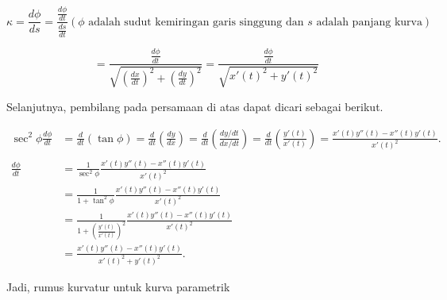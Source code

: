 \documentclass[12pt,Times new roman,letterpaper]{book}
\begin{document}
\begin{eulernootebook}
\begin{eulercomment}
\begin{eulercomment}
\begin{eulernootebook}
\begin{eulercomment}
\begin{eulercomment}
\begin{eulercomment}
\begin{eulercomment}
\begin{eulercomment}
\begin{eulercomment}
\begin{eulernotebook}
\begin{eulercomment}
\begin{eulercomment}
\begin{eulercomment}
\begin{eulercomment}
\begin{eulercomment}
\begin{eulercomment}
\begin{eulercomment}
\begin{eulercomment}
\begin{eulercomment}
\begin{eulercomment}
\begin{eulercomment}
\begin{eulercomment}
\begin{eulercomment}
\begin{eulercomment}
\begin{eulercomment}
\begin{eulercomment}
\begin{eulercomment}
\begin{eulercomment}
\begin{eulercomment}
\begin{eulercomment}
\begin{eulercomment}
\end{eulercomment}
\begin{eulerformula}
\[
\kappa=\frac{d\phi}{ds}=\frac{\frac{d\phi}{dt}}{\frac{ds}{dt}}  (\phi \text{ adalah sudut kemiringan garis singgung dan } s \text{ adalah panjang kurva})
\]
\end{eulerformula}
\begin{eulercomment}
\end{eulercomment}
\begin{eulerformula}
\[
=\frac{\frac{d\phi}{dt}}{\sqrt{(\frac{dx}{dt})^2 + (\frac{dy}{dt})^2}} = \frac{\frac{d\phi}{dt}}{\sqrt{x'(t)^2+y'(t)^2}}
\]
\end{eulerformula}
\begin{eulercomment}
Selanjutnya, pembilang pada persamaan di atas dapat dicari sebagai
berikut.

\end{eulercomment}
\begin{eulerformula}
\[
\begin{aligned}\sec^2\phi\frac{d\phi}{dt} &= \frac{d}{dt}\left(\tan\phi\right)= \frac{d}{dt}\left(\frac{dy}{dx}\right)= \frac{d}{dt}\left(\frac{dy/dt}{dx/dt}\right)= \frac{d}{dt}\left(\frac{y'(t)}{x'(t)}\right)=\frac{x'(t)y''(t)-x''(t)y'(t)}{x'(t)^2}.\\ & \\ \frac{d\phi}{dt} &= \frac{1}{\sec^2\phi}\frac{x'(t)y''(t)-x''(t)y'(t)}{x'(t)^2}\\ &= \frac{1}{1+\tan^2\phi}\frac{x'(t)y''(t)-x''(t)y'(t)}{x'(t)^2}\\ &= \frac{1}{1+\left(\frac{y'(t)}{x'(t)}\right)^2}\frac{x'(t)y''(t)-x''(t)y'(t)}{x'(t)^2}\\ &= \frac{x'(t)y''(t)-x''(t)y'(t)}{x'(t)^2+y'(t)^2}.\end{aligned}
\]
\end{eulerformula}
\begin{eulercomment}
Jadi, rumus kurvatur untuk kurva parametrik


\end{eulercomment}
\end{eulercomment}
\end{eulercomment}
\end{eulercomment}
\end{eulercomment}
\end{eulercomment}
\end{eulercomment}
\end{eulercomment}
\end{eulercomment}
\end{eulercomment}
\end{eulercomment}
\end{eulercomment}
\end{eulercomment}
\end{eulercomment}
\end{eulercomment}
\end{eulercomment}
\end{eulercomment}
\end{eulercomment}
\end{eulercomment}
\end{eulercomment}
\end{eulercomment}
\end{eulernotebook}
\end{eulercomment}
\end{eulercomment}
\end{eulercomment}
\end{eulercomment}
\end{eulercomment}
\end{eulercomment}
\end{eulernootebook}
\end{eulercomment}
\end{eulercomment}
\end{eulernootebook}
\end{document}
